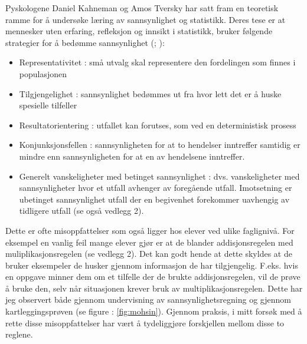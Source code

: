 \documentclass[main.tex]{subfiles}
\begin{document}
Pyskologene Daniel Kahneman og Amos Tversky har satt fram en teoretisk 
ramme for å undersøke læring av sannsynlighet og statistikk. Deres tese er at mennesker uten erfaring, refleksjon og 
innsikt i statistikk, bruker følgende strategier for å bedømme sannsynlighet (; ):
\begin{itemize}
\item Representativitet : små utvalg skal representere den fordelingen som finnes i populasjonen
\item Tilgjengelighet : sannsynlighet bedømmes ut fra hvor lett det er å huske spesielle tilfeller
\item Resultatorientering : utfallet kan forutses, som ved en deterministisk prosess
\item Konjunksjonsfellen : sannsynligheten for at to hendelser inntreffer samtidig er mindre enn sannsynligheten
for at en av hendelsene inntreffer.
\item Generelt vanskeligheter med betinget sannsynlighet : dvs. vanskeligheter med sannsynligheter hvor et utfall
avhenger av foregående utfall. Imotsetning er ubetinget sannsynlighet utfall der en begivenhet forekommer uavhengig 
av tidligere utfall (se også vedlegg 2). 
\end{itemize}
Dette er ofte misoppfattelser som også ligger hos elever ved ulike faglignivå. For eksempel en vanlig feil
mange elever gjør er at de blander addisjonsregelen med muliplikasjonsregelen (se vedlegg 2). Det kan godt hende at dette
skyldes at de bruker eksempeler de husker gjennom informasjon de har tilgjengelig. F.eks. hvis en oppgave minner
dem om et tilfelle der de brukte addisjonsregelen, vil de prøve å bruke den, selv når situasjonen krever bruk
av multiplikasjonsregelen. Dette har jeg observert både gjennom undervisning av sannsynlighetsregning og
gjennom kartleggingsprøven (se figure : \ref{fig:mohsin}). Gjennom praksis, i mitt forsøk med å rette disse 
misoppfattelser har vært å tydeliggjøre forskjellen mellom disse to reglene. 
\newline
\end{document}
